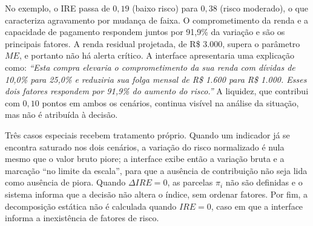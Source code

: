 \documentclass[portuguese]{sbc2025}%
\begin{document}
\begin{table}[!ht]
\caption{Exemplo ilustrativo da decomposição da variação do IRE.}
\centering
{}
\label{tab:exemplo-sim}
\end{table}

No exemplo, o IRE passa de $0{,}19$ (baixo risco) para $0{,}38$ (risco moderado), o que caracteriza agravamento por mudança de faixa. O comprometimento da renda e a capacidade de pagamento respondem juntos por 91,9\% da variação e são os principais fatores. A renda residual projetada, de R\$ 3.000, supera o parâmetro $ME$, e portanto não há alerta crítico. A interface apresentaria uma explicação como: \textit{``Esta compra elevaria o comprometimento da sua renda com dívidas de 10,0\% para 25,0\% e reduziria sua folga mensal de R\$ 1.600 para R\$ 1.000. Esses dois fatores respondem por 91,9\% do aumento do risco.''} A liquidez, que contribui com $0{,}10$ pontos em ambos os cenários, continua visível na análise da situação, mas não é atribuída à decisão.

Três casos especiais recebem tratamento próprio. Quando um indicador já se encontra saturado nos dois cenários, a variação do risco normalizado é nula mesmo que o valor bruto piore; a interface exibe então a variação bruta e a marcação ``no limite da escala'', para que a ausência de contribuição não seja lida como ausência de piora. Quando $\Delta IRE = 0$, as parcelas $\pi_i$ não são definidas e o sistema informa que a decisão não altera o índice, sem ordenar fatores. Por fim, a decomposição estática não é calculada quando $IRE = 0$, caso em que a interface informa a inexistência de fatores de risco.
\end{document}
